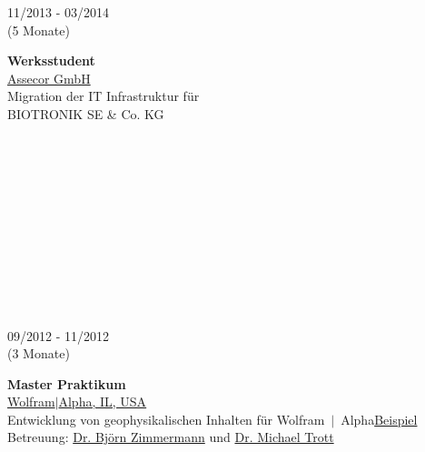 \documentclass{article}
\begin{document}
\begin{minipage}[t]{0.67\textwidth}
\begin{minipage}{0.49\textwidth}
		\begin{minipage}[t]{0.254\textwidth}
		11/2013 - 03/2014 \\ (5 Monate)
		\end{minipage}
		\hfill
		\begin{minipage}[t]{0.75\textwidth}
		\textbf{Werksstudent}\\
		\href{https://assecor.de/}{\color{pblue}Assecor GmbH}\\
	    Migration der IT Infrastruktur für\\ BIOTRONIK SE \& Co. KG
		\end{minipage}
		\\\\\\\\\\\\\\\\\\\\
		\end{minipage}	
		\hfill
		\vrule	
		\hfill
		\begin{minipage}{0.49\textwidth}
		\begin{minipage}[t]{0.25\textwidth}
		09/2012 - 11/2012 \\ (3 Monate)
		\end{minipage}		
		\hfill
		\begin{minipage}[t]{0.75\textwidth}
		\textbf{Master Praktikum}\\
		\href{https:///www.wolframalpha.com/}{\color{pblue}Wolfram$\mid$Alpha, IL, USA}\\
	    Entwicklung von geophysikalischen Inhalten für Wolfram$~\mid~$Alpha\hfill \href{https://m.wolframalpha.com/input/?i=moment+magnitude}{\color{pblue}Beispiel}\\
	    Betreuung: \href{mailto:bjornz@wolfram.com }{Dr. Björn Zimmermann} und \href{mailto:mtrott@wolfram.com }{Dr. Michael Trott} 
		\end{minipage}
		

\end{minipage}
\end{minipage}
\end{document}
